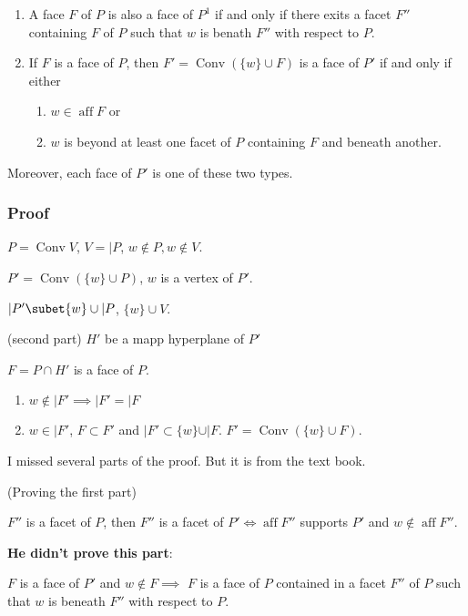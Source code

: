 \documentclass[11pt]{article}
\def\aff{\operatorname{aff}}
\def\conv{\operatorname{Conv}}
\begin{document}
{{{{\begin{enumerate}
\item A face \(F\) of \(P\) is also a face of \(P^1\) if and only if there exits a
facet \(F''\) containing \(F\) of \(P\) such that \(w\) is benath \(F''\) with
respect to \(P\).
\item If \(F\) is a face of \(P\), then \(F' = \conv(\{w \} \cup F)\) is a face of
\(P'\) if and only if either 
\begin{enumerate}
\item \(w\in \aff F\) or
\item \(w\) is beyond at least one facet of \(P\) containing \(F\) and beneath
another.
\end{enumerate}
\end{enumerate}

Moreover, each face of \(P'\) is one of these two types.
\subsubsection{Proof}
\label{sec:org5f14f5a}
\(P = \conv V\), \(V = \vert P\), \(w \notin P, w \notin V\).

\(P' = \conv(\{w \} \cup P)\), \(w\) is a vertex of \(P'\).

\(\vert P' \subet \{w\} \cup \vert P\), \(\{w\} \cup V\).

(second part) \(H'\) be a mapp hyperplane of \(P'\)

\(F = P \cap H'\) is a face of \(P\).

\begin{enumerate}
\item \(w \notin \vert F' \implies \vert F' = \vert F\)

\item \(w \in \vert F'\), \(F \subset F'\) and \(\vert F' \subset \{w \} \cup \vert
       F\). \(F' = \conv(\{w\} \cup F)\).
\end{enumerate}

I missed several parts of the proof. But it is from the text book.

(Proving the first part)

\(F''\) is a facet of \(P\), then \(F''\) is a facet of \(P' \iff \aff F''\)
supports \(P'\) and \(w \notin \aff F''\).

\textbf{He didn't prove this part}: 

\(F\) is a face of \(P'\) and \(w \notin F \implies\) \(F\) is a face of \(P\)
contained in a facet \(F''\) of \(P\) such that \(w\) is beneath \(F''\) with
respect to \(P\).

}}}}
\end{document}
